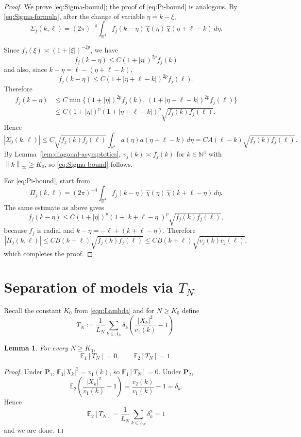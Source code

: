 \documentclass[11pt, reqno]{amsart}
\newtheorem{lemma}{Lemma}
\theoremstyle{remark}
\newcommand{\R}{\mathbb{R}}
\newcommand{\N}{\mathbb{N}}
\newcommand{\E}{\mathbb{E}}
\newcommand{\1}{\mathbf{1}}
\newcommand{\abs}[1]{\left\lvert #1 \right\rvert}
\newcommand{\norm}[1]{\left\lVert #1 \right\rVert}
\begin{document}
\begin{proof}
We prove \eqref{eq:Sigma-bound}; the proof of \eqref{eq:Pi-bound} is analogous.
By \eqref{eq:Sigma-formula}, after the change of variable $\eta=k-\xi$,
\[
\Sigma_j(k,\ell)
=(2\pi)^{-4}\int_{\R^4} f_j(k-\eta)\,\widehat{\chi}(\eta)\,
\overline{\widehat{\chi}(\eta+\ell-k)}\,d\eta .
\]

Since $f_j(\xi)\asymp (1+|\xi|)^{-2p}$, we have
\[
f_j(k-\eta)\le C(1+|\eta|)^{2p} f_j(k)
\]
and also, since $k-\eta=\ell-(\eta+\ell-k)$,
\[
f_j(k-\eta)\le C(1+|\eta+\ell-k|)^{2p} f_j(\ell).
\]
Therefore
\begin{align*}
f_j(k-\eta)
&\le C\min\Big\{(1+|\eta|)^{2p}f_j(k),\,
(1+|\eta+\ell-k|)^{2p}f_j(\ell)\Big\}
\\
&\le C(1+|\eta|)^p(1+|\eta+\ell-k|)^p\sqrt{f_j(k)f_j(\ell)} .
\end{align*}
Hence
\[
|\Sigma_j(k,\ell)|
\le
C\sqrt{f_j(k)f_j(\ell)}
\int_{\R^4} a(\eta)a(\eta+\ell-k)\,d\eta
=
C A(\ell-k)\sqrt{f_j(k)f_j(\ell)} .
\]
By Lemma~\ref{lem:diagonal-asymptotics}, $v_j(k)\asymp f_j(k)$ for $k\in\N^4$
with $\norm{k}_\infty\ge K_0$, so \eqref{eq:Sigma-bound} follows.

For \eqref{eq:Pi-bound}, start from
\[
\Pi_j(k,\ell)
=(2\pi)^{-4}\int_{\R^4} f_j(k-\eta)\,\widehat{\chi}(\eta)\,
\widehat{\chi}(k+\ell-\eta)\,d\eta .
\]
The same estimate as above gives
\[
f_j(k-\eta)
\le
C(1+|\eta|)^p(1+|k+\ell-\eta|)^p\sqrt{f_j(k)f_j(\ell)},
\]
because $f_j$ is radial and $k-\eta=-\ell+(k+\ell-\eta)$.
Therefore
\[
|\Pi_j(k,\ell)|
\le
C B(k+\ell)\sqrt{f_j(k)f_j(\ell)}
\le
C B(k+\ell)\sqrt{v_j(k)v_j(\ell)},
\]
which completes the proof.
\end{proof}

\section{Separation of models via $T_N$}
Recall the constant $K_0$ from \eqref{eqn:Lambda} and 
for $N\ge K_0$ define
\begin{equation}\label{eq:TN-def}
T_N:=\frac1{L_N}\sum_{k\in\Lambda_N} \delta_k\left(\frac{\abs{X_k}^2}{v_1(k)}-1\right).
\end{equation}

\begin{lemma}\label{lem:means}
For every $N\ge K_0$,
\[
\E_1[T_N]=0,
\qquad
\E_2[T_N]=1.
\]
\end{lemma}

\begin{proof}
Under $\mathbf P_1$, $\E_1\abs{X_k}^2=v_1(k)$, so $\E_1[T_N]=0$.
Under $\mathbf P_2$,
\[
\E_2\left(\frac{\abs{X_k}^2}{v_1(k)}-1\right)=\frac{v_2(k)}{v_1(k)}-1=\delta_k.
\]
Hence
\[
\E_2[T_N]=\frac1{L_N}\sum_{k\in\Lambda_N}\delta_k^2=1
\]
and we are done.
\end{proof}
\end{document}
